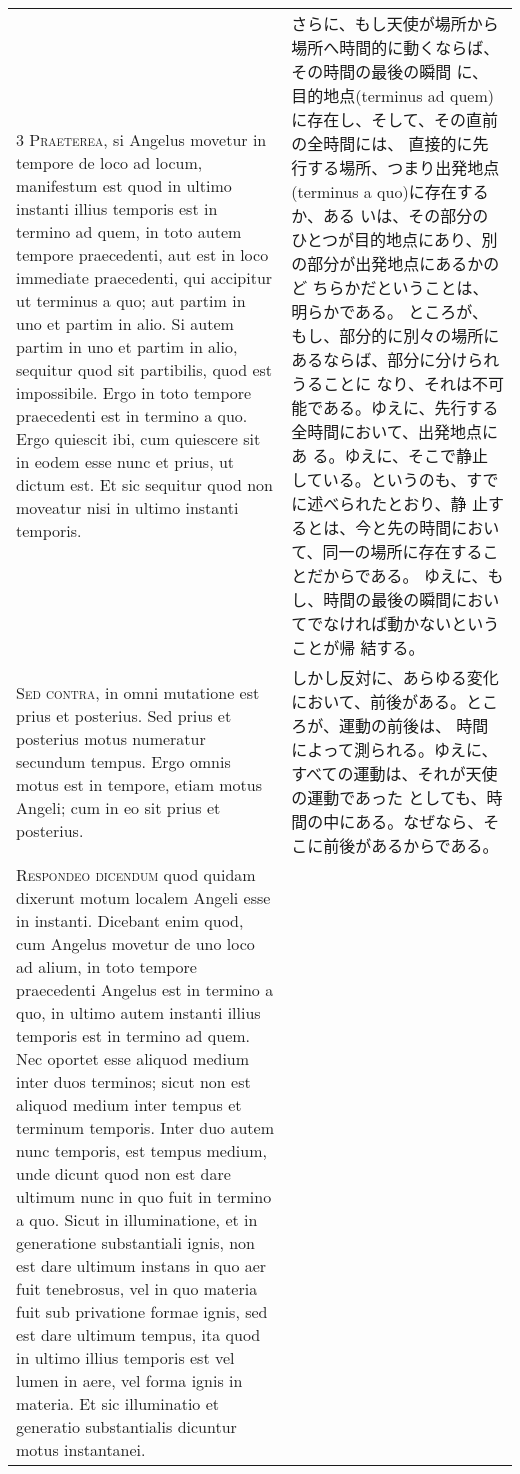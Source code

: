 \documentclass[10pt]{jsarticle} %
\begin{document}
\begin{longtable}{p{21em}p{21em}}
\\


{\scshape 3 Praeterea}, si Angelus movetur in tempore de
loco ad locum, manifestum est quod in ultimo instanti illius temporis
est in termino ad quem, in toto autem tempore praecedenti, aut est in
loco immediate praecedenti, qui accipitur ut terminus a quo; aut partim
in uno et partim in alio. Si autem partim in uno et partim in alio,
sequitur quod sit partibilis, quod est impossibile. Ergo in toto tempore
praecedenti est in termino a quo. Ergo quiescit ibi, cum quiescere sit
in eodem esse nunc et prius, ut dictum est. Et sic sequitur quod non
moveatur nisi in ultimo instanti temporis.

&

さらに、もし天使が場所から場所へ時間的に動くならば、その時間の最後の瞬間
 に、目的地点(terminus ad quem)に存在し、そして、その直前の全時間には、
 直接的に先行する場所、つまり出発地点(terminus a quo)に存在するか、ある
 いは、その部分のひとつが目的地点にあり、別の部分が出発地点にあるかのど
 ちらかだということは、明らかである。
ところが、もし、部分的に別々の場所にあるならば、部分に分けられうることに
 なり、それは不可能である。ゆえに、先行する全時間において、出発地点にあ
 る。ゆえに、そこで静止している。というのも、すでに述べられたとおり、静
 止するとは、今と先の時間において、同一の場所に存在することだからである。
 ゆえに、もし、時間の最後の瞬間においてでなければ動かないということが帰
 結する。

\\


{\scshape  Sed contra}, in omni mutatione est prius et
posterius. Sed prius et posterius motus numeratur secundum tempus. Ergo
omnis motus est in tempore, etiam motus Angeli; cum in eo sit prius et
posterius.

&
しかし反対に、あらゆる変化において、前後がある。ところが、運動の前後は、
 時間によって測られる。ゆえに、すべての運動は、それが天使の運動であった
 としても、時間の中にある。なぜなら、そこに前後があるからである。

\\


{\scshape Respondeo dicendum} quod quidam dixerunt motum
localem Angeli esse in instanti. Dicebant enim quod, cum Angelus movetur
de uno loco ad alium, in toto tempore praecedenti Angelus est in termino
a quo, in ultimo autem instanti illius temporis est in termino ad
quem. Nec oportet esse aliquod medium inter duos terminos; sicut non est
aliquod medium inter tempus et terminum temporis. Inter duo autem nunc
temporis, est tempus medium, unde dicunt quod non est dare ultimum nunc
in quo fuit in termino a quo. Sicut in illuminatione, et in generatione
substantiali ignis, non est dare ultimum instans in quo aer fuit
tenebrosus, vel in quo materia fuit sub privatione formae ignis, sed est
dare ultimum tempus, ita quod in ultimo illius temporis est vel lumen in
aere, vel forma ignis in materia. Et sic illuminatio et generatio
substantialis dicuntur motus instantanei. 


\end{longtable}
\end{document}
